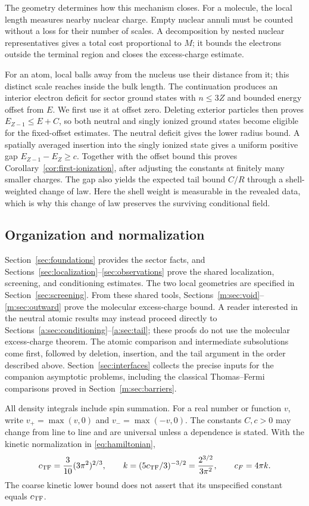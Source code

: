 The geometry determines how this mechanism closes. For a molecule, the
local length measures nearby nuclear charge. Empty nuclear annuli must be
counted without a loss for their number of scales. A decomposition by
nested nuclear representatives gives a total cost proportional to $M$;
it bounds the electrons outside the terminal region and closes the
excess-charge estimate.

For an atom, local balls away from the nucleus use their distance from it;
this distinct scale reaches inside the bulk length. The continuation
produces an interior electron deficit for sector ground states with
$n\le3Z$ and bounded energy offset from $E$. We first use it at offset zero. Deleting exterior particles then
proves $E_{Z-1}\le E+C$, so both neutral and singly ionized ground states
become eligible for the fixed-offset estimates. The neutral deficit gives
the lower radius bound. A spatially averaged insertion into the singly
ionized state gives a uniform positive gap $E_{Z-1}-E_Z\ge c$. Together
with the offset bound this proves Corollary~\ref{cor:first-ionization},
after adjusting the constants at finitely many smaller charges. The gap
also yields the expected tail bound $C/R$ through a shell-weighted change
of law. Here the shell weight is measurable in the revealed data, which
is why this change of law preserves the surviving conditional field.

\subsection{Organization and normalization}

Section~\ref{sec:foundations} provides the sector facts, and
Sections~\ref{sec:localization}--\ref{sec:observations} prove the shared
localization, screening, and conditioning estimates. The two local
geometries are specified in Section~\ref{sec:screening}. From these shared
tools, Sections~\ref{m:sec:void}--\ref{m:sec:outward} prove the molecular
excess-charge bound. A reader interested in the neutral atomic results
may instead proceed directly to Sections~\ref{a:sec:conditioning}--\ref{a:sec:tail};
these proofs do not use the molecular excess-charge theorem. The atomic
comparison and intermediate subsolutions come first, followed by deletion,
insertion, and the tail argument in the order described above.
Section~\ref{sec:interfaces} collects the precise inputs for the companion
asymptotic problems, including the classical Thomas--Fermi comparisons
proved in Section~\ref{m:sec:barriers}.

All density integrals include spin summation. For a real number or
function $v$, write $v_+=\max(v,0)$ and $v_-=\max(-v,0)$. The constants
$C,c>0$ may change from line to line and are universal unless a dependence
is stated. With the kinetic normalization in \eqref{eq:hamiltonian},
\begin{equation}\label{eq:tf-constants}
 c_{\rm TF}=\frac3{10}(3\pi^2)^{2/3},\qquad
 k=(5c_{\rm TF}/3)^{-3/2}=\frac{2^{3/2}}{3\pi^2},\qquad c_F=4\pi k.
\end{equation}
The coarse kinetic lower bound does not assert that its unspecified
constant equals $c_{\rm TF}$.
